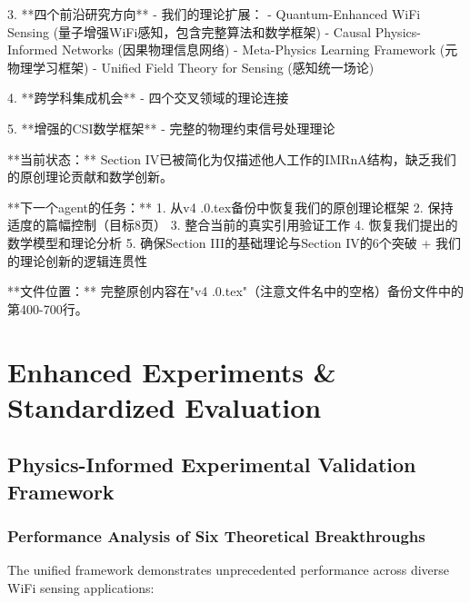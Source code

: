 \documentclass[journal]{IEEEtran}
\begin{document}
3. **四个前沿研究方向** - 我们的理论扩展：
   - Quantum-Enhanced WiFi Sensing (量子增强WiFi感知，包含完整算法和数学框架)
   - Causal Physics-Informed Networks (因果物理信息网络)
   - Meta-Physics Learning Framework (元物理学习框架)
   - Unified Field Theory for Sensing (感知统一场论)

4. **跨学科集成机会** - 四个交叉领域的理论连接

5. **增强的CSI数学框架** - 完整的物理约束信号处理理论

**当前状态：** Section IV已被简化为仅描述他人工作的IMRnA结构，缺乏我们的原创理论贡献和数学创新。

**下一个agent的任务：**
1. 从v4 .0.tex备份中恢复我们的原创理论框架
2. 保持适度的篇幅控制（目标8页）
3. 整合当前的真实引用验证工作
4. 恢复我们提出的数学模型和理论分析
5. 确保Section III的基础理论与Section IV的6个突破 + 我们的理论创新的逻辑连贯性

**文件位置：** 完整原创内容在"v4 .0.tex"（注意文件名中的空格）备份文件中的第400-700行。



\section{Enhanced Experiments \& Standardized Evaluation}
\label{sec:experiments}

\subsection{Physics-Informed Experimental Validation Framework}

\subsubsection{Performance Analysis of Six Theoretical Breakthroughs}

The unified framework demonstrates unprecedented performance across diverse WiFi sensing applications:
\end{document}
